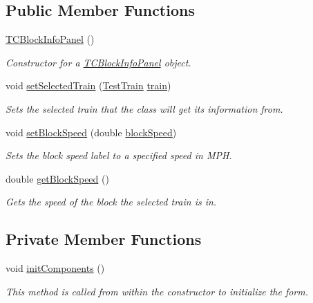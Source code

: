 \subsection*{Public Member Functions}
\begin{DoxyCompactItemize}
\item 
\hyperlink{classTrainControllerComps_1_1TCBlockInfoPanel_a44a1b4c66f0a95faae3698b9a37cd71c}{T\+C\+Block\+Info\+Panel} ()
\begin{DoxyCompactList}\small\item\em Constructor for a \hyperlink{classTrainControllerComps_1_1TCBlockInfoPanel}{T\+C\+Block\+Info\+Panel} object. \end{DoxyCompactList}\item 
void \hyperlink{classTrainControllerComps_1_1TCBlockInfoPanel_a930f11785e7efa17ccc8909d885de1c5}{set\+Selected\+Train} (\hyperlink{classTrainControllerComps_1_1TestTrain}{Test\+Train} \hyperlink{classtrain}{train})
\begin{DoxyCompactList}\small\item\em Sets the selected train that the class will get its information from. \end{DoxyCompactList}\item 
void \hyperlink{classTrainControllerComps_1_1TCBlockInfoPanel_a2579f1bf5addf760f020e222f831b35a}{set\+Block\+Speed} (double \hyperlink{classTrainControllerComps_1_1TCBlockInfoPanel_a3b3aa9808843291162c5f169c7aea308}{block\+Speed})
\begin{DoxyCompactList}\small\item\em Sets the block speed label to a specified speed in M\+PH. \end{DoxyCompactList}\item 
double \hyperlink{classTrainControllerComps_1_1TCBlockInfoPanel_af6abb156c9e61d36d7fd3d8cb8c899f6}{get\+Block\+Speed} ()
\begin{DoxyCompactList}\small\item\em Gets the speed of the block the selected train is in. \end{DoxyCompactList}\end{DoxyCompactItemize}
\subsection*{Private Member Functions}
\begin{DoxyCompactItemize}
\item 
void \hyperlink{classTrainControllerComps_1_1TCBlockInfoPanel_a0bbafa154ac2cdc3b83140374e85ed25}{init\+Components} ()
\begin{DoxyCompactList}\small\item\em This method is called from within the constructor to initialize the form. \end{DoxyCompactList}\end{DoxyCompactItemize}
